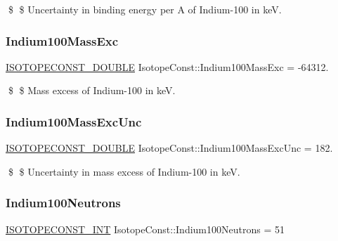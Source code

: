 \$ \$ Uncertainty in binding energy per A of Indium-\/100 in keV. \mbox{\label{group___isotope_const-_indium-_in100_gadc8bdf7d94e93eb585dde00a03ae4836}} 
\subsubsection{\texorpdfstring{Indium100\+Mass\+Exc}{Indium100MassExc}}
{\footnotesize\ttfamily \mbox{\hyperlink{group___isotope_const-_macros_ga8f45a7272ce02c0b4c65c44636ed719a}{I\+S\+O\+T\+O\+P\+E\+C\+O\+N\+S\+T\+\_\+\+D\+O\+U\+B\+LE}} Isotope\+Const\+::\+Indium100\+Mass\+Exc = -\/64312.}

\$ \$ Mass excess of Indium-\/100 in keV. \mbox{\label{group___isotope_const-_indium-_in100_ga7961a09ce4a3df934ab0c12cdbfbfb22}} 
\subsubsection{\texorpdfstring{Indium100\+Mass\+Exc\+Unc}{Indium100MassExcUnc}}
{\footnotesize\ttfamily \mbox{\hyperlink{group___isotope_const-_macros_ga8f45a7272ce02c0b4c65c44636ed719a}{I\+S\+O\+T\+O\+P\+E\+C\+O\+N\+S\+T\+\_\+\+D\+O\+U\+B\+LE}} Isotope\+Const\+::\+Indium100\+Mass\+Exc\+Unc = 182.}

\$ \$ Uncertainty in mass excess of Indium-\/100 in keV. \mbox{\label{group___isotope_const-_indium-_in100_ga50ba37dc024975c722ab70b477c7c37c}} 
\subsubsection{\texorpdfstring{Indium100\+Neutrons}{Indium100Neutrons}}
{\footnotesize\ttfamily \mbox{\hyperlink{group___isotope_const-_macros_ga5f18360b3e99483a35c32d789e62621c}{I\+S\+O\+T\+O\+P\+E\+C\+O\+N\+S\+T\+\_\+\+I\+NT}} Isotope\+Const\+::\+Indium100\+Neutrons = 51}

